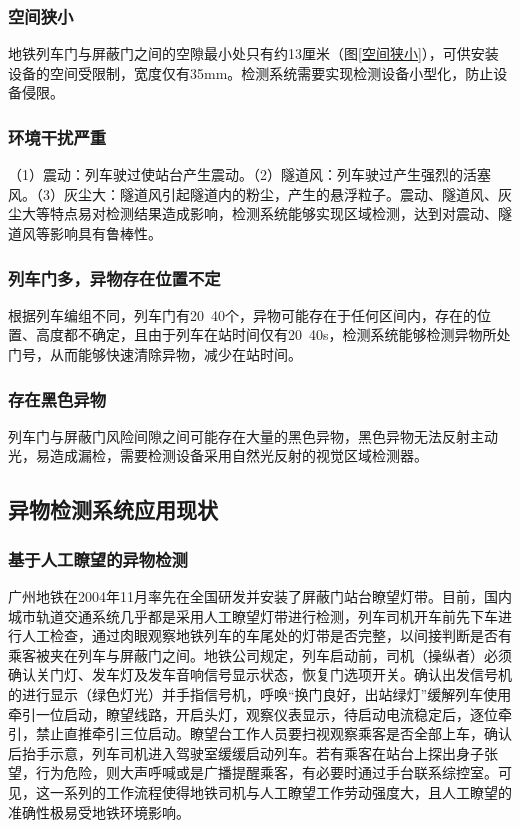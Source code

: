 \subsubsection*{空间狭小}
地铁列车门与屏蔽门之间的空隙最小处只有约13厘米（图\ref{空间狭小}），可供安装设备的空间受限制，宽度仅有35mm。检测系统需要实现检测设备小型化，防止设备侵限。
\subsubsection*{环境干扰严重}
（1）震动：列车驶过使站台产生震动。（2）隧道风：列车驶过产生强烈的活塞风。（3）灰尘大：隧道风引起隧道内的粉尘，产生的悬浮粒子。震动、隧道风、灰尘大等特点易对检测结果造成影响，检测系统能够实现区域检测，达到对震动、隧道风等影响具有鲁棒性。
\subsubsection*{列车门多，异物存在位置不定}
根据列车编组不同，列车门有20~40个，异物可能存在于任何区间内，存在的位置、高度都不确定，且由于列车在站时间仅有20~40s，检测系统能够检测异物所处门号，从而能够快速清除异物，减少在站时间。
\subsubsection*{存在黑色异物}
列车门与屏蔽门风险间隙之间可能存在大量的黑色异物，黑色异物无法反射主动光，易造成漏检，需要检测设备采用自然光反射的视觉区域检测器。
\subsection{异物检测系统应用现状}
\subsubsection*{基于人工瞭望的异物检测}
广州地铁在2004年11月率先在全国研发并安装了屏蔽门站台瞭望灯带。目前，国内城市轨道交通系统几乎都是采用人工瞭望灯带进行检测，列车司机开车前先下车进行人工检查，通过肉眼观察地铁列车的车尾处的灯带是否完整，以间接判断是否有乘客被夹在列车与屏蔽门之间。地铁公司规定，列车启动前，司机（操纵者）必须确认关门灯、发车灯及发车音响信号显示状态，恢复门选项开关。确认出发信号机的进行显示（绿色灯光）并手指信号机，呼唤“换门良好，出站绿灯”缓解列车使用牵引一位启动，瞭望线路，开启头灯，观察仪表显示，待启动电流稳定后，逐位牵引，禁止直推牵引三位启动。瞭望台工作人员要扫视观察乘客是否全部上车，确认后抬手示意，列车司机进入驾驶室缓缓启动列车。若有乘客在站台上探出身子张望，行为危险，则大声呼喊或是广播提醒乘客，有必要时通过手台联系综控室。可见，这一系列的工作流程使得地铁司机与人工瞭望工作劳动强度大，且人工瞭望的准确性极易受地铁环境影响。
